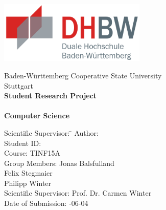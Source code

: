 \begin{titlepage}

\begin{minipage}{\textwidth}
		\vspace{-2cm}
		\centering \includegraphics[width=7cm, keepaspectratio]{img/dhbw_logo.png}
		\vspace{1cm}
\end{minipage}

\vspace{1em}

\sffamily
\begin{center}
	\textsf{\large{}Baden-Württemberg Cooperative State University\\[1.5mm] Stuttgart}\\[2em] 
	\vspace{1cm}
	\textsf{\textbf{\Large{}Student Research Project}}\\ 
	\vspace{1cm}
	\textsf{\textbf{\dertitel}} \\[2em]	
	\vspace{1cm}
	\textsf{\textbf{\Large{}Computer Science}}\\
	\vspace{2cm}
\vfill

\begin{minipage}{\textwidth}

\begin{tabbing}
	Scientific Supervisor: \hspace{1.85cm}\=\kill
	Author: \> \derautor \\[1.5mm]
	Student ID: \\[1.5mm]
	Course: \> TINF15A\\[1.5mm]
	Group Members: \> Jonas Balsfulland\\
	\> Felix Stegmaier\\
	\> Philipp Winter\\[1.5mm]
	Scientific Supervisor: \> Prof. Dr. Carmen Winter \\[1.5mm]
	Date of Submission: -06-04\\
\end{tabbing}
\end{minipage}

\end{center}

\end{titlepage}
